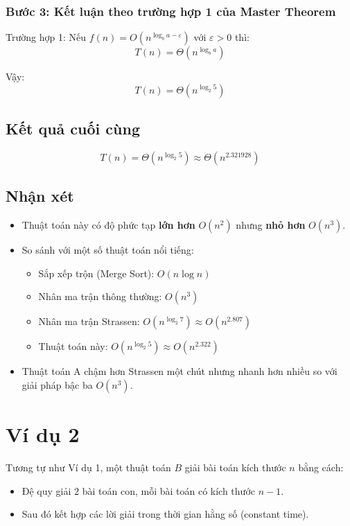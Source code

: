 \documentclass{article}
\begin{document}
\subsubsection{Bước 3: Kết luận theo trường hợp 1 của Master Theorem}

Trường hợp 1: Nếu \(f(n) = O\left(n^{\log_b a - \varepsilon}\right)\) với \(\varepsilon > 0\) thì:
\[
T(n) = \Theta\left(n^{\log_b a}\right)
\]

Vậy:
\[
\boxed{T(n) = \Theta\left(n^{\log_2 5}\right)}
\]

\subsection{Kết quả cuối cùng}

\[
T(n) = \Theta\left(n^{\log_2 5}\right) \approx \Theta\left(n^{2.321928}\right)
\]

\subsection{Nhận xét}

\begin{itemize}
    \item Thuật toán này có độ phức tạp \textbf{lớn hơn} \(O(n^2)\) nhưng \textbf{nhỏ hơn} \(O(n^3)\).
    \item So sánh với một số thuật toán nổi tiếng:
    \begin{itemize}
        \item Sắp xếp trộn (Merge Sort): \(O(n \log n)\)
        \item Nhân ma trận thông thường: \(O(n^3)\)
        \item Nhân ma trận Strassen: \(O(n^{\log_2 7}) \approx O(n^{2.807})\)
        \item Thuật toán này: \(O(n^{\log_2 5}) \approx O(n^{2.322})\)
    \end{itemize}
    \item Thuật toán A chậm hơn Strassen một chút nhưng nhanh hơn nhiều so với giải pháp bậc ba \(O(n^3)\).
\end{itemize}

\section{Ví dụ 2}

Tương tự như Ví dụ 1, một thuật toán \(B\) giải bài toán kích thước \(n\) bằng cách:
\begin{itemize}
    \item Đệ quy giải \(2\) bài toán con, mỗi bài toán có kích thước \(n - 1\).
    \item Sau đó kết hợp các lời giải trong thời gian hằng số (constant time).
\end{itemize}
\end{document}

